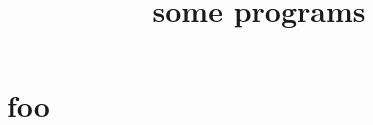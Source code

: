 \documentclass[a4paper]{report}
\begin{document}

\title{some programs}

\maketitle

{\sffamily
\tableofcontents
}

\chapter{foo}

\end{document}
